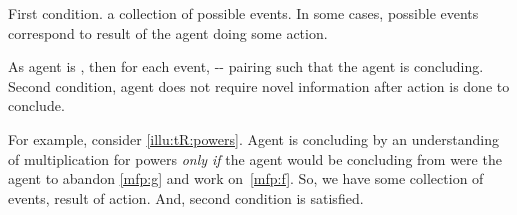 \begin{note}
  First condition.
  \tCV{} a collection of possible events.
  In some cases, possible events correspond to result of the agent doing some action.

  As agent is \tCV{}, then for each event, -- pairing such that the agent is concluding.
  Second condition, agent does not require novel information after action is done to conclude.

  For example, consider \autoref{illu:tR:powers}.
  Agent is concluding  by an understanding of multiplication for powers \emph{only if} the agent would be concluding  from  were the agent to abandon \ref{mfp:g} and work on~\ref{mfp:f}.
  So, we have some collection of events, result of action.
  And, second condition is satisfied.
\end{note}

